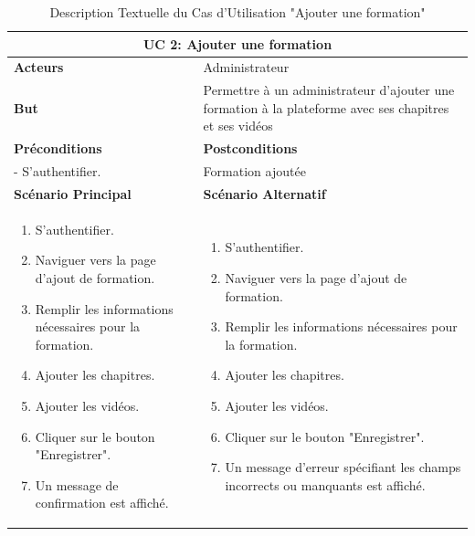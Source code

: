 \newpage

\begin{minipage}{\textwidth}
\begin{table}[H]
\centering
\begin{tabular}{| m{8cm} | m{8cm} |}
\hline
\multicolumn{2}{|c|}{\textbf{UC 2:} Ajouter une formation} \\ \hline
\textbf{Acteurs} & Administrateur \\ \hline
\textbf{But} & Permettre à un administrateur d'ajouter une formation à la plateforme avec ses chapitres et ses vidéos \\ \hline
\textbf{Préconditions} & \textbf{Postconditions} \\ \hline
- S'authentifier. & Formation ajoutée \\ \hline
\textbf{Scénario Principal} & \textbf{Scénario Alternatif} \\ \hline
\begin{enumerate}
    \item S'authentifier.
    \item Naviguer vers la page d'ajout de formation.
    \item Remplir les informations nécessaires pour la formation.
    \item Ajouter les chapitres.
    \item Ajouter les vidéos.
    \item Cliquer sur le bouton "Enregistrer".
    \item Un message de confirmation est affiché.
\end{enumerate} & 
\begin{enumerate}
    \item S'authentifier.
    \item Naviguer vers la page d'ajout de formation.
    \item Remplir les informations nécessaires pour la formation.
    \item Ajouter les chapitres.
    \item Ajouter les vidéos.
    \item Cliquer sur le bouton "Enregistrer".
    \item Un message d'erreur spécifiant les champs incorrects ou manquants est affiché.
\end{enumerate} \\ \hline
\end{tabular}
\caption{Description Textuelle du Cas d'Utilisation "Ajouter une formation"}
\label{tab:use_case_description_2}
\end{table}
\end{minipage}

